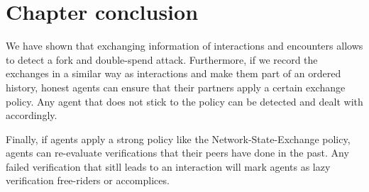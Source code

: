 \section{Chapter conclusion}
We have shown that exchanging information of interactions and encounters allows to detect a fork 
and double-spend attack. Furthermore, if we record the exchanges in a similar way as interactions and
make them part of an ordered history, honest agents can ensure that their partners apply a certain 
exchange policy. Any agent that does not stick to the policy can be detected and dealt with accordingly.

Finally, if agents apply a strong policy like the Network-State-Exchange policy, agents can 
re-evaluate verifications that their peers have done in the past. Any failed verification that sitll 
leads to an interaction will mark agents as lazy verification free-riders or accomplices.